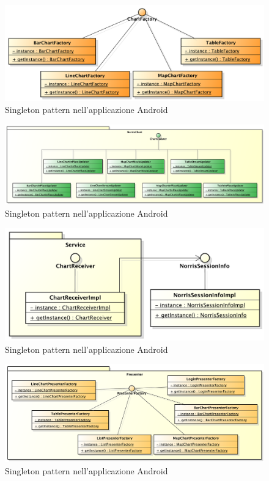                     \begin{figure}[H]\centering
	        			\includegraphics[width=\textwidth]{SpecificaTecnica/Pics/DesignPatternNorris/Singleton2}
	        			\caption{Singleton pattern nell'applicazione Android}
	    			\end{figure}
	    			\begin{figure}[H]\centering
	        			\includegraphics[width=\textwidth]{SpecificaTecnica/Pics/DesignPatternNorris/Singleton1}
	        			\caption{Singleton pattern nell'applicazione Android}
	    			\end{figure}
	    			\begin{figure}[H]\centering
	        			\includegraphics[width=\textwidth]{SpecificaTecnica/Pics/DesignPatternApp/Singleton1}
	        			\caption{Singleton pattern nell'applicazione Android}
	    			\end{figure}
	    			\begin{figure}[H]\centering
	        			\includegraphics[width=\textwidth]{SpecificaTecnica/Pics/DesignPatternApp/Singleton2}
	        			\caption{Singleton pattern nell'applicazione Android}
	    			\end{figure}
